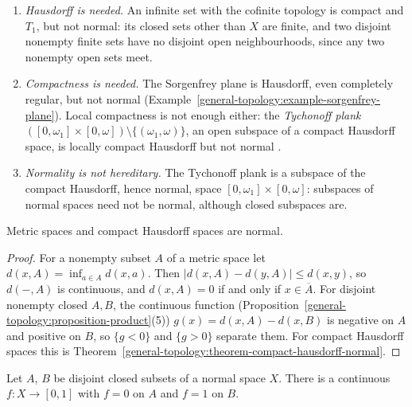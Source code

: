 \begin{counterexample}\label{general-topology:counterexample-compact-not-normal}
\begin{enumerate}
\item \emph{Hausdorff is needed.} An infinite set with the cofinite topology is compact and $T_1$, but not normal: its closed sets other than $X$ are finite, and two disjoint nonempty finite sets have no disjoint open neighbourhoods, since any two
nonempty open sets meet.
\item \emph{Compactness is needed.} The Sorgenfrey plane is Hausdorff, even completely regular, but not normal (Example~\ref{general-topology:example-sorgenfrey-plane}). Local compactness is not enough either: the \emph{Tychonoff plank}
$([0, \omega_1] \times [0, \omega]) \setminus \{(\omega_1, \omega)\}$, an open subspace of a compact Hausdorff space, is locally compact Hausdorff but not normal \cite{engelking-general-topology}.
\item \emph{Normality is not hereditary.} The Tychonoff plank is a subspace of the compact Hausdorff, hence normal, space $[0, \omega_1] \times [0, \omega]$: subspaces of normal spaces need not be normal, although closed subspaces are.
\end{enumerate}
\end{counterexample}

\begin{proposition}\label{general-topology:proposition-normal-examples}
Metric spaces and compact Hausdorff spaces are normal.
\end{proposition}

\begin{proof}
For a nonempty subset $A$ of a metric space let $d(x, A) = \inf_{a \in A} d(x, a)$. Then $|d(x, A) - d(y, A)| \leq d(x, y)$, so $d(-, A)$ is continuous, and
$d(x, A) = 0$ if and only if $x \in \overline{A}$. For disjoint nonempty closed $A, B$, the continuous function (Proposition~\ref{general-topology:proposition-product}(5)) $g(x) = d(x, A) - d(x, B)$ is negative on $A$ and positive
on $B$, so $\{g < 0\}$ and $\{g > 0\}$ separate them. For compact Hausdorff spaces this is Theorem~\ref{general-topology:theorem-compact-hausdorff-normal}.
\end{proof}

\begin{theorem}\label{general-topology:theorem-urysohn}
Let $A$, $B$ be disjoint closed subsets of a normal space $X$. There is a continuous $f \colon X \to [0, 1]$ with $f = 0$ on $A$ and $f = 1$ on $B$.
\end{theorem}

